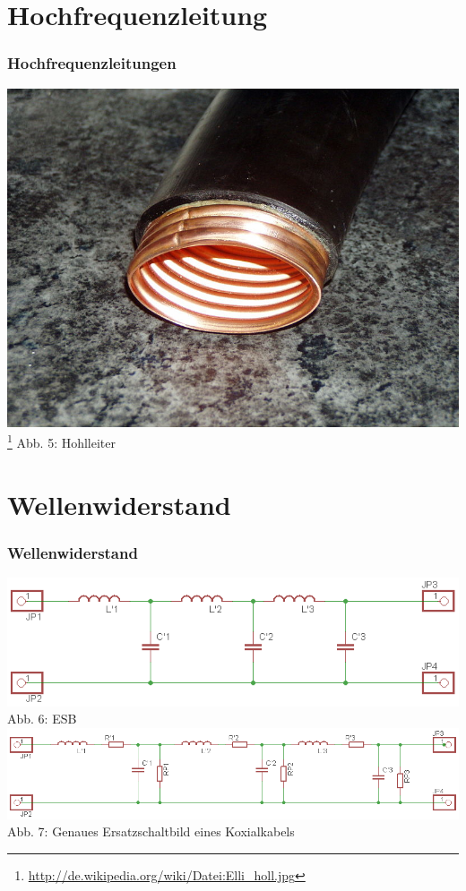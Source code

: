 \section*{Hochfrequenzleitung}
\begin{frame}
\frametitle{Hochfrequenzleitungen}
\begin{center}
\includegraphics[scale=0.4]{e10/hohl.jpg}\\
\footnote{\url{http://de.wikipedia.org/wiki/Datei:Elli_holl.jpg}}
Abb. 5: Hohlleiter
\end{center}
\end{frame}

\section*{Wellenwiderstand}
\begin{frame}
\frametitle{Wellenwiderstand}
\includegraphics[scale=0.8]{e10/wellenesb.png}\\
Abb. 6: ESB 
\vspace{1cm}\\
\includegraphics[scale=0.65]{e10/wellenesbex.png}\\
Abb. 7: Genaues Ersatzschaltbild eines Koxialkabels
\end{frame}

